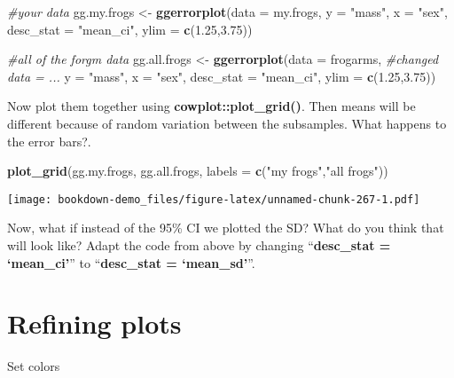 \documentclass[]{book}
\newenvironment{Shaded}{\begin{snugshade}}{\end{snugshade}}
\newcommand{\KeywordTok}[1]{\textcolor[rgb]{0.13,0.29,0.53}{\textbf{#1}}}
\newcommand{\DataTypeTok}[1]{\textcolor[rgb]{0.13,0.29,0.53}{#1}}
\newcommand{\FloatTok}[1]{\textcolor[rgb]{0.00,0.00,0.81}{#1}}
\newcommand{\StringTok}[1]{\textcolor[rgb]{0.31,0.60,0.02}{#1}}
\newcommand{\CommentTok}[1]{\textcolor[rgb]{0.56,0.35,0.01}{\textit{#1}}}
\newcommand{\NormalTok}[1]{#1}
\theoremstyle{definition}
\theoremstyle{definition}
\theoremstyle{definition}
\theoremstyle{remark}
\begin{document}
\begin{Shaded}
\begin{Highlighting}[]
\CommentTok{#your data}
\NormalTok{gg.my.frogs <-}\StringTok{ }\KeywordTok{ggerrorplot}\NormalTok{(}\DataTypeTok{data =}\NormalTok{ my.frogs,}
          \DataTypeTok{y =} \StringTok{"mass"}\NormalTok{,}
          \DataTypeTok{x =} \StringTok{"sex"}\NormalTok{,}
          \DataTypeTok{desc_stat =} \StringTok{"mean_ci"}\NormalTok{,}
          \DataTypeTok{ylim =} \KeywordTok{c}\NormalTok{(}\FloatTok{1.25}\NormalTok{,}\FloatTok{3.75}\NormalTok{))}

\CommentTok{#all of the forgm data}
\NormalTok{gg.all.frogs <-}\StringTok{ }\KeywordTok{ggerrorplot}\NormalTok{(}\DataTypeTok{data =}\NormalTok{ frogarms, }\CommentTok{#changed data = ...}
          \DataTypeTok{y =} \StringTok{"mass"}\NormalTok{,}
          \DataTypeTok{x =} \StringTok{"sex"}\NormalTok{,}
          \DataTypeTok{desc_stat =} \StringTok{"mean_ci"}\NormalTok{,}
          \DataTypeTok{ylim =} \KeywordTok{c}\NormalTok{(}\FloatTok{1.25}\NormalTok{,}\FloatTok{3.75}\NormalTok{))}
\end{Highlighting}
\end{Shaded}

Now plot them together using \textbf{cowplot::plot\_grid()}. Then means
will be different because of random variation between the subsamples.
What happens to the error bars?.

\begin{Shaded}
\begin{Highlighting}[]
\KeywordTok{plot_grid}\NormalTok{(gg.my.frogs, }
\NormalTok{          gg.all.frogs,}
          \DataTypeTok{labels =} \KeywordTok{c}\NormalTok{(}\StringTok{"my frogs"}\NormalTok{,}\StringTok{"all frogs"}\NormalTok{))}
\end{Highlighting}
\end{Shaded}

\texttt{[image: bookdown-demo\_files/figure-latex/unnamed-chunk-267-1.pdf]}

Now, what if instead of the 95\% CI we plotted the SD? What do you think
that will look like? Adapt the code from above by changing
``\textbf{desc\_stat = `mean\_ci'}'' to ``\textbf{desc\_stat =
`mean\_sd'}''.

\section{Refining plots}\label{refining-plots}

Set colors
\end{document}
